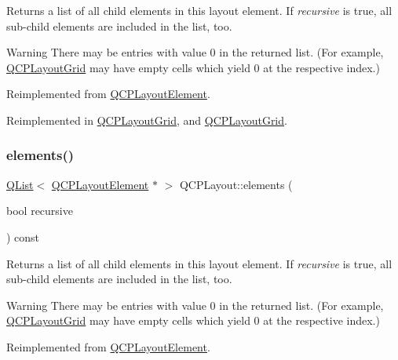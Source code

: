 Returns a list of all child elements in this layout element. If {\itshape recursive} is true, all sub-\/child elements are included in the list, too.

\begin{DoxyWarning}{Warning}
There may be entries with value 0 in the returned list. (For example, \hyperlink{class_q_c_p_layout_grid}{Q\+C\+P\+Layout\+Grid} may have empty cells which yield 0 at the respective index.) 
\end{DoxyWarning}


Reimplemented from \hyperlink{class_q_c_p_layout_element_a76dec8cb31e498994a944d7647a43309}{Q\+C\+P\+Layout\+Element}.



Reimplemented in \hyperlink{class_q_c_p_layout_grid_a7d5b968b4cf57393e9e387976d91f8f7}{Q\+C\+P\+Layout\+Grid}, and \hyperlink{class_q_c_p_layout_grid_adc2b77187862688f52796d208bd9756c}{Q\+C\+P\+Layout\+Grid}.

\mbox{\label{class_q_c_p_layout_aca129722c019f91d3367046f80abfa77}} 
\subsubsection{\texorpdfstring{elements()}{elements()}\hspace{0.1cm}{\footnotesize\ttfamily [2/2]}}
{\footnotesize\ttfamily \hyperlink{class_q_list}{Q\+List}$<$ \hyperlink{class_q_c_p_layout_element}{Q\+C\+P\+Layout\+Element} $\ast$ $>$ Q\+C\+P\+Layout\+::elements (\begin{DoxyParamCaption}\item[{bool}]{recursive }\end{DoxyParamCaption}) const\hspace{0.3cm}{\ttfamily [virtual]}}

Returns a list of all child elements in this layout element. If {\itshape recursive} is true, all sub-\/child elements are included in the list, too.

\begin{DoxyWarning}{Warning}
There may be entries with value 0 in the returned list. (For example, \hyperlink{class_q_c_p_layout_grid}{Q\+C\+P\+Layout\+Grid} may have empty cells which yield 0 at the respective index.) 
\end{DoxyWarning}


Reimplemented from \hyperlink{class_q_c_p_layout_element_a76dec8cb31e498994a944d7647a43309}{Q\+C\+P\+Layout\+Element}.



